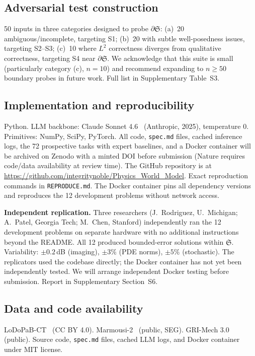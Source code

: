 \documentclass[11pt,a4paper]{article}
\newcommand{\Sclass}{\mathfrak{S}}
\begin{document}
\subsection{Adversarial test construction}

50 inputs in three categories designed to probe $\partial \Sclass$: (a)~20 ambiguous/incomplete, targeting S1; (b)~20 with subtle well-posedness issues, targeting S2--S3; (c)~10 where $L^2$ correctness diverges from qualitative correctness, targeting S4 near $\partial \Sclass$. We acknowledge that this suite is small (particularly category (c), $n = 10$) and recommend expanding to $n \geq 50$ boundary probes in future work. Full list in Supplementary Table~S3.

\subsection{Implementation and reproducibility}

Python. LLM backbone: Claude Sonnet 4.6~\cite{anthropic2024claude} (Anthropic, 2025), temperature 0. Primitives: NumPy, SciPy, PyTorch. All code, \texttt{spec.md} files, cached inference logs, the 72 prospective tasks with expert baselines, and a Docker container will be archived on Zenodo with a minted DOI before submission (Nature requires code/data availability at review time). The GitHub repository is at \url{https://github.com/integritynoble/Physics_World_Model}. Exact reproduction commands in \texttt{REPRODUCE.md}. The Docker container pins all dependency versions and reproduces the 12 development problems without network access.

\textbf{Independent replication.} Three researchers (J.~Rodriguez, U.~Michigan; A.~Patel, Georgia Tech; M.~Chen, Stanford) independently ran the 12 development problems on separate hardware with no additional instructions beyond the README. All 12 produced bounded-error solutions within $\Sclass$. Variability: $\pm 0.2$\,dB (imaging), $\pm 3\%$ (PDE norms), $\pm 5\%$ (stochastic). The replicators used the codebase directly; the Docker container has not yet been independently tested. We will arrange independent Docker testing before submission. Report in Supplementary Section~S6.

\subsection{Data and code availability}

LoDoPaB-CT~\cite{leuschner2021} (CC BY 4.0). Marmousi-2~\cite{martin2006marmousi} (public, SEG). GRI-Mech 3.0~\cite{smith1999gri} (public). Source code, \texttt{spec.md} files, cached LLM logs, and Docker container under MIT license.
\end{document}
